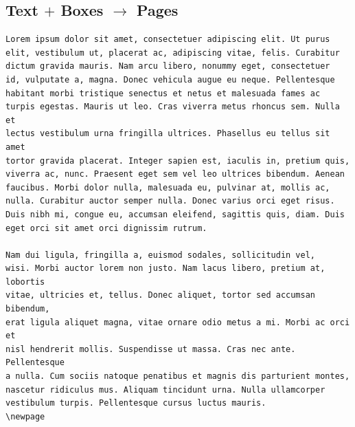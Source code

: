 \documentclass[
	layoutmode=block,
	blockwidth=96mm, blockheight=108mm,
	bleed=0mm,
	bindingoffset=0mm,
	imageblockwidth=0.98, imageblockheight=0.98,
	imageblockoffsettop=0mm,
	12pt,final,openany
]{photobook}
\begin{document}

\begin{page}%
\scriptsize%
\vfill%
\begin{center}%
\end{center}%
\vfill%
\end{page}
%
\pagecolor{lightgray}
\pagecolor{white}



\begin{spreadtopages}
	\vfill
	\begin{center}
		\section*{Text $+$ Boxes $\longrightarrow$ Pages}
	\end{center}
	\vfill
\end{spreadtopages}
\newpage



\begin{page}
\fontsize{5pt}{5.5pt}\selectfont
\vfill
\begin{center}
\begin{BVerbatim}
Lorem ipsum dolor sit amet, consectetuer adipiscing elit. Ut purus
elit, vestibulum ut, placerat ac, adipiscing vitae, felis. Curabitur
dictum gravida mauris. Nam arcu libero, nonummy eget, consectetuer
id, vulputate a, magna. Donec vehicula augue eu neque. Pellentesque
habitant morbi tristique senectus et netus et malesuada fames ac
turpis egestas. Mauris ut leo. Cras viverra metus rhoncus sem. Nulla et
lectus vestibulum urna fringilla ultrices. Phasellus eu tellus sit amet
tortor gravida placerat. Integer sapien est, iaculis in, pretium quis,
viverra ac, nunc. Praesent eget sem vel leo ultrices bibendum. Aenean
faucibus. Morbi dolor nulla, malesuada eu, pulvinar at, mollis ac,
nulla. Curabitur auctor semper nulla. Donec varius orci eget risus.
Duis nibh mi, congue eu, accumsan eleifend, sagittis quis, diam. Duis
eget orci sit amet orci dignissim rutrum.

Nam dui ligula, fringilla a, euismod sodales, sollicitudin vel,
wisi. Morbi auctor lorem non justo. Nam lacus libero, pretium at, lobortis
vitae, ultricies et, tellus. Donec aliquet, tortor sed accumsan bibendum,
erat ligula aliquet magna, vitae ornare odio metus a mi. Morbi ac orci et
nisl hendrerit mollis. Suspendisse ut massa. Cras nec ante. Pellentesque
a nulla. Cum sociis natoque penatibus et magnis dis parturient montes,
nascetur ridiculus mus. Aliquam tincidunt urna. Nulla ullamcorper
vestibulum turpis. Pellentesque cursus luctus mauris.
\newpage
\end{BVerbatim}
\end{center}
\vfill
\null
\end{page}
\end{document}
